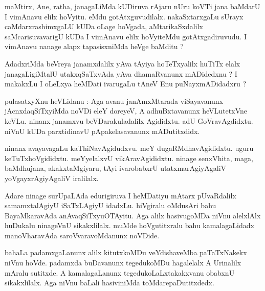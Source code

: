 \documentclass{article}
\begin{document}
\begin{mn}
maMtirx,  Ane,  ratha,  janagaLiMda  kUDiruva  rAjaru  nUru  koVTi jana  baMdarU  I  vimAnavu  
elilx  hoVyitu.  eMdu  gotAtxguvudilalx.  nakaSxtarxgaLu  sUrayx  caMdarxrashimxgaLU  kUDa  
oLage  hoVgada,  aMtarikaSxdalilx  saMcarisuvavarigU  kUDa  I vimAnavu  elilx  hoVyiteMdu  
gotAtxgadiruvudu.  I  vimAnavu  nanage  alapx  tapasisxniMda  heVge  baMditu ?
\end{mn}

\begin{mn}
AdadxriMda  beVreya  janamxdalilx  yAva  tAyiya  hoTeTxyalilx  huTiTx  elalx  
janagaLigiMtalU  utakxqSaTxvAda  yAva  dhamaRvanunx  mADidedxnu ?  I  makakxLu  
I oLeLxya  heMDati  ivarugaLu  tAneV  Enu  puNayxmADidadxru ?
\end{mn}

\begin{mn}
pulasatxyXnu  heVLidanu :-Aga  avanu  janAmxMtarada  viSayavanunx  jAcnxdaqSiTxyiMda  noVDi  
eleY  doreyeV,  A adhuBxtavanunx  heVLutetxVne  keVLu.  ninanx  janamxvu  beVDarakuladalilx  
Agididxtu.  adU  GoVravAgdidxtu.  niVnU  kUDa  parxtidinavU  pApakelasavanunx  mADutitxdidx.
\end{mn}

\begin{mn}
ninanx  avayavagaLu  kaThiNavAgidudxvu.  meY  dugaRMdhavAgididxtu.  uguru  keTuTxhoVgididxtu.  
meYyelalxvU  vikAravAgididxtu.  ninage  senxVhita,  maga,  baMdhujana,  akakxtaMgiyaru,  
tAyi  ivarobabxrU  utatxmarAgiyAgaliV  yoVgayxrAgiyAgaliV  iralilalx.
\end{mn}

\begin{mn}
Adare   ninage  surUpaLAda  edurigiruva  I  heMDatiyu  mAtarx  pUvaRdalilx  samamxtalAgiyU  
iSaTxLAgiyU  idadxLu.  hiVgiralu  oMdusAri  bahu  BayaMkaravAda  anAvaqSiTxyuOTAyitu.  Aga  
alilx  hasivugoMDa  niVnu  alelxlAlx  huDukalu  ninageVnU  sikakxlilalx.  muMde  hoVgutitxralu  
bahu  kamalagaLidadx  manoVharavAda  saroVvaravoMdanunx  noVDide.
\end{mn}

\begin{mn}
bahaLa  padamxgaLanunx  alilx  kitutxkoMDu  veYdishaveMba  paTaTxNakekx  niVnu  hoVde.  
padamxda  buDavanunx  tegedukoMDu  hagalelalx  A  Urinalilx  mAralu  sutitxde.  A  
kamalagaLanunx  tegedukoLaLxtakakxvanu  obabxnU  sikakxlilalx.  Aga  niVnu  baLali  
hasiviniMda  toMdarepaDutitxdedx.
\end{mn}
\end{document}
